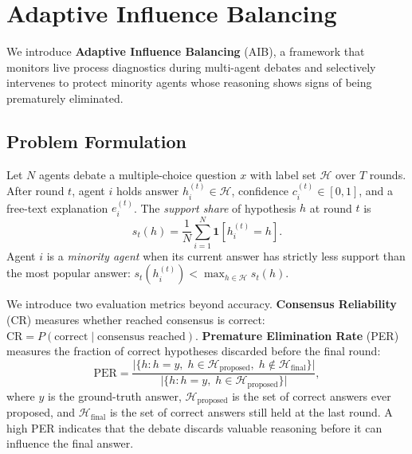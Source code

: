 \section{Adaptive Influence Balancing}
\label{sec:method}

We introduce \textbf{Adaptive Influence Balancing} (AIB), a framework that
monitors live process diagnostics during multi-agent debates and selectively
intervenes to protect minority agents whose reasoning shows signs of being
prematurely eliminated.

\subsection{Problem Formulation}
\label{sec:formulation}

Let $N$ agents debate a multiple-choice question $x$ with label set
$\mathcal{H}$ over $T$ rounds.
After round $t$, agent $i$ holds answer $h_i^{(t)}\!\in\!\mathcal{H}$,
confidence $c_i^{(t)}\!\in\![0,1]$, and a free-text explanation
$e_i^{(t)}$.
The \emph{support share} of hypothesis $h$ at round $t$ is
\begin{equation}
  s_t(h)=\frac{1}{N}\sum_{i=1}^{N}\mathbf{1}[h_i^{(t)}=h].
\end{equation}
Agent $i$ is a \emph{minority agent} when its current answer has strictly
less support than the most popular answer:
$s_t(h_i^{(t)}) < \max_{h\in\mathcal{H}} s_t(h)$.

We introduce two evaluation metrics beyond accuracy.
\textbf{Consensus Reliability} (CR) measures whether reached consensus is
correct:
$\text{CR} = P(\text{correct}\mid\text{consensus reached})$.
\textbf{Premature Elimination Rate} (PER) measures the fraction of correct
hypotheses discarded before the final round:
\begin{equation}
  \text{PER} = \frac{\bigl|\{h : h=y,\;h\!\in\!\mathcal{H}_{\mathrm{proposed}},\;h\!\notin\!\mathcal{H}_{\mathrm{final}}\}\bigr|}
                    {\bigl|\{h : h=y,\;h\!\in\!\mathcal{H}_{\mathrm{proposed}}\}\bigr|},
\end{equation}
where $y$ is the ground-truth answer, $\mathcal{H}_{\mathrm{proposed}}$ is
the set of correct answers ever proposed, and $\mathcal{H}_{\mathrm{final}}$
is the set of correct answers still held at the last round.
A high PER indicates that the debate discards valuable reasoning before it
can influence the final answer.

